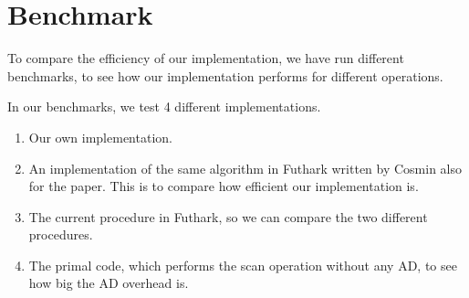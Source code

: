 \documentclass{article}
\begin{document}
\section{Benchmark}
To compare the efficiency of our implementation,
we have run different benchmarks,
to see how our implementation performs for different operations.

In our benchmarks, we test 4 different implementations.
\begin{enumerate}

	\item Our own implementation.
	\item An implementation of the same algorithm in Futhark written by Cosmin
	      also for the \cite{Futhark} paper.
	      This is to compare how efficient our implementation is.
	\item The current procedure in Futhark, so we can compare the two
	      different procedures.
	\item The primal code, which performs the scan operation without any AD,
	      to see how big the AD overhead is.

\end{enumerate}
\end{document}
